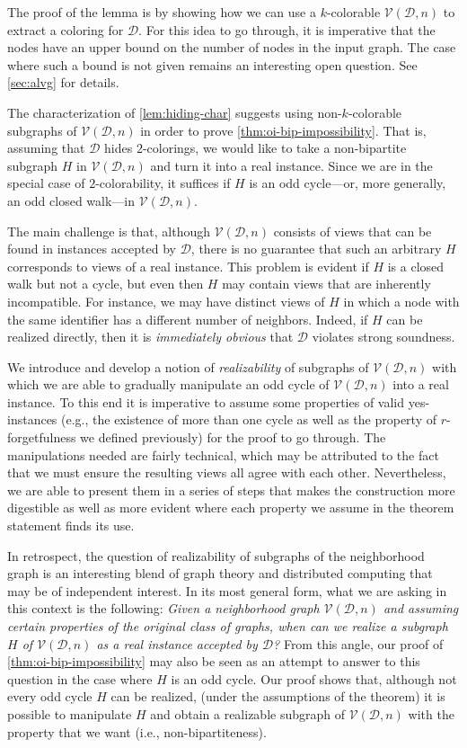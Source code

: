 \documentclass[11pt]{article}
\newcommand*{\alvgd}{\mathcal{V}(\mathcal{D},n)}
\begin{document}
The proof of the lemma is by showing how we can use a $k$-colorable $\alvgd$ to
extract a coloring for $\mathcal{D}$.
For this idea to go through, it is imperative that the nodes have an upper bound
on the number of nodes in the input graph.
The case where such a bound is not given remains an interesting open question.
See \cref{sec:alvg} for details.

The characterization of \cref{lem:hiding-char} suggests using non-$k$-colorable
subgraphs of $\alvgd$ in order to prove \cref{thm:oi-bip-impossibility}.
That is, assuming that $\mathcal{D}$ hides $2$-colorings, we would like to take
a non-bipartite subgraph $H$ in $\alvgd$ and turn it into a real instance.
Since we are in the special case of $2$-colorability, it suffices if $H$ is an
odd cycle---or, more generally, an odd closed walk---in $\alvgd$.

The main challenge is that, although $\alvgd$ consists of views that can be
found in instances accepted by $\mathcal{D}$, there is no guarantee that such an
arbitrary $H$ corresponds to views of a real instance.
This problem is evident if $H$ is a closed walk but not a cycle, but even then
$H$ may contain views that are inherently incompatible.
For instance, we may have distinct views of $H$ in which a node with the same
identifier has a different number of neighbors.
Indeed, if $H$ can be realized directly, then it is \emph{immediately obvious}
that $\mathcal{D}$ violates strong soundness.

We introduce and develop a notion of \emph{realizability} of subgraphs of
$\alvgd$ with which we are able to gradually manipulate an odd cycle of $\alvgd$
into a real instance.
To this end it is imperative to assume some properties of valid yes-instances
(e.g., the existence of more than one cycle as well as the property of
$r$-forgetfulness we defined previously) for the proof to go through.
The manipulations needed are fairly technical, which may be attributed to the
fact that we must ensure the resulting views all agree with each other.
Nevertheless, we are able to present them in a series of steps that makes the
construction more digestible as well as more evident where each property we
assume in the theorem statement finds its use.

In retrospect, the question of realizability of subgraphs of the neighborhood
graph is an interesting blend of graph theory and distributed computing that may
be of independent interest.
In its most general form, what we are asking in this context is the following:
\emph{Given a neighborhood graph $\alvgd$ and assuming certain properties of the
original class of graphs, when can we realize a subgraph $H$ of $\alvgd$ as a
real instance accepted by $\mathcal{D}$?}
From this angle, our proof of \cref{thm:oi-bip-impossibility} may also be seen
as an attempt to answer to this question in the case where $H$ is an odd cycle.
Our proof shows that, although not every odd cycle $H$ can be realized, (under
the assumptions of the theorem) it is possible to manipulate $H$ and obtain a
realizable subgraph of $\alvgd$ with the property that we want (i.e.,
non-bipartiteness).
\end{document}
